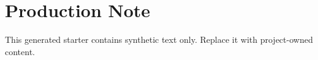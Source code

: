 \documentclass[10pt,twoside,openany]{book}
\begin{document}
\PSEBeginFrontMatter
\PSETitlePage
\PSEPublicationPage
\tableofcontents
\clearpage
\PSEBeginBody

\PSEBeginBackMatter
\chapter*{Production Note}
This generated starter contains synthetic text only. Replace it with project-owned content.
\PSEPrintIndex
\end{document}
